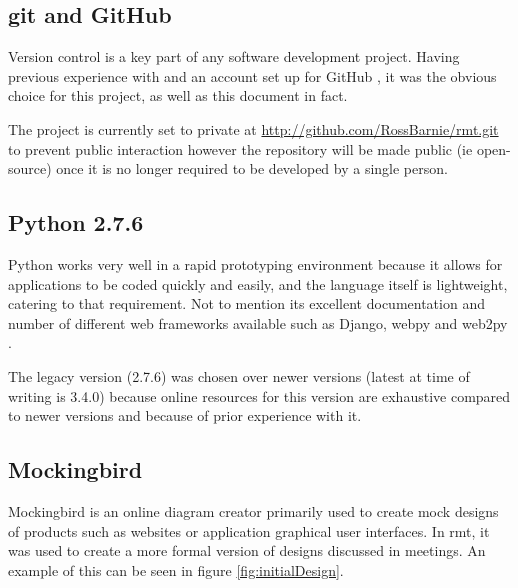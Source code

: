 \subsection{git and GitHub}
Version control is a key part of any software development project.
Having previous experience with and an account set up for GitHub \citeyearpar{github}, it was the obvious choice for this project, as well as this document in fact.

The project is currently set to private at \url{http://github.com/RossBarnie/rmt.git} to prevent public interaction however the repository will be made public (ie open-source) once it is no longer required to be developed by a single person.

\subsection{Python 2.7.6}
Python works very well in a rapid prototyping environment because it allows for applications to be coded quickly and easily, and the language itself is lightweight, catering to that requirement.
Not to mention its excellent documentation and number of different web frameworks available such as Django\citep{django}, webpy \citep{webpy} and web2py \citeyearpar{web2py}.

The legacy version (2.7.6) was chosen over newer versions (latest at time of writing is 3.4.0) because online resources for this version are exhaustive compared to newer versions and because of prior experience with it.

\subsection{Mockingbird}
Mockingbird \citep{mockingbird} is an online diagram creator primarily used to create mock designs of products such as websites or application graphical user interfaces.
In rmt, it was used to create a more formal version of designs discussed in meetings.
An example of this can be seen in figure \ref{fig:initialDesign}.

